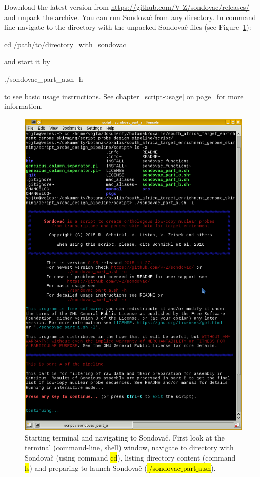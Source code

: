 \documentclass[a4paper, 11pt, twoside]{article}
\renewcommand{\texttt}[1]{\hl{\ttfamily #1}}
\begin{document}
Download the latest version from \url{https://github.com/V-Z/sondovac/releases/} and unpack the archive. You can run Sondovač from any directory. In command line navigate to the directory with the unpacked Sondovač files (see Figure~\ref{terminal}):

\begin{bashcode}
  cd /path/to/directory_with_sondovac
\end{bashcode}

and start it by

\begin{bashcode}
  ./sondovac_part_a.sh -h
\end{bashcode}

to see basic usage instructions. See chapter~\ref{script-usage} on page~\pageref{script-usage} for more information.

\begin{figure}[htbp]
  \includegraphics[width=\textwidth]{terminal.png}
  \caption[Starting terminal and navigating to Sondovač]{Starting terminal and navigating to Sondovač. First look at the terminal (command-line, shell) window, navigate to directory with Sondovač (using command \texttt{cd}), listing directory content (command \texttt{ls}) and preparing to launch Sondovač (\texttt{./sondovac$\_$part$\_$a.sh}).}
  \label{terminal}
\end{figure}
\end{document}
